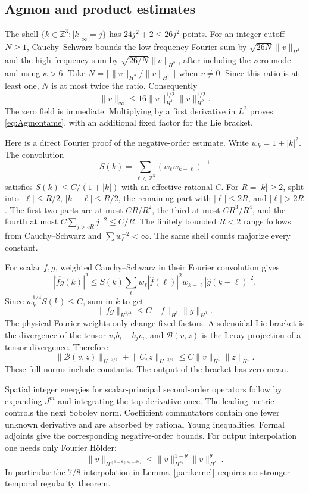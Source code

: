 \documentclass[11pt,a4paper]{amsart}
\theoremstyle{definition}
\theoremstyle{remark}
\numberwithin{equation}{section}
\newcommand{\Z}{\mathbb Z}
\newcommand{\Bcal}{\mathcal B}
\newcommand{\norm}[1]{\lVert #1\rVert}
\begin{document}
\subsection{Agmon and product estimates}
The shell $\{k\in\Z^3:|k|_\infty=j\}$ has $24j^2+2\le26j^2$ points. For an integer cutoff $N\ge1$, Cauchy--Schwarz bounds the low-frequency Fourier sum by $\sqrt{26N}\|v\|_{H^1}$ and the high-frequency sum by $\sqrt{26/N}\|v\|_{H^2}$, after including the zero mode and using $\kappa>6$. Take $N=\lceil\|v\|_{H^2}/\|v\|_{H^1}\rceil$ when $v\ne0$. Since this ratio is at least one, $N$ is at most twice the ratio. Consequently
\begin{equation}\label{eq:appagmon}
 \norm v_\infty\le16\norm v_{H^1}^{1/2}\norm v_{H^2}^{1/2}.
\end{equation}
The zero field is immediate. Multiplying by a first derivative in $L^2$ proves \eqref{eq:Agmontame}, with an additional fixed factor for the Lie bracket.

Here is a direct Fourier proof of the negative-order estimate. Write $w_k=1+|k|^2$. The convolution
\[
 S(k)=\sum_{\ell\in\Z^3}(w_\ell w_{k-\ell})^{-1}
\]
satisfies $S(k)\le C/(1+|k|)$ with an effective rational $C$. For $R=|k|\ge2$, split into $|\ell|\le R/2$, $|k-\ell|\le R/2$, the remaining part with $|\ell|\le2R$, and $|\ell|>2R$. The first two parts are at most $CR/R^2$, the third at most $CR^3/R^4$, and the fourth at most $C\sum_{j>cR}j^{-2}\le C/R$. The finitely bounded $R<2$ range follows from Cauchy--Schwarz and $\sum w_\ell^{-2}<\infty$. The same shell counts majorize every constant.

For scalar $f,g$, weighted Cauchy--Schwarz in their Fourier convolution gives
\[
 |\widehat{fg}(k)|^2\le S(k)
   \sum_\ell w_\ell|\widehat f(\ell)|^2
                   w_{k-\ell}|\widehat g(k-\ell)|^2.
\]
Since $w_k^{1/4}S(k)\le C$, sum in $k$ to get
\[
 \norm{fg}_{H^{1/4}}\le C\norm f_{H^1}\norm g_{H^1}.
\]
The physical Fourier weights only change fixed factors. A solenoidal Lie bracket is the divergence of the tensor $v_jb_i-b_jv_i$, and $\Bcal(v,z)$ is the Leray projection of a tensor divergence. Therefore
\begin{equation}\label{eq:appnegative}
 \norm{\Bcal(v,z)}_{H^{-3/4}}+\norm{C_vz}_{H^{-3/4}}
 \le C\norm v_{H^1}\norm z_{H^1}.
\end{equation}
These full norms include constants. The output of the bracket has zero mean.

Spatial integer energies for scalar-principal second-order operators follow by expanding $J^m$ and integrating the top derivative once. The leading metric controls the next Sobolev norm. Coefficient commutators contain one fewer unknown derivative and are absorbed by rational Young inequalities. Formal adjoints give the corresponding negative-order bounds. For output interpolation one needs only Fourier H\"older:
\[
 \norm v_{H^{(1-\theta)s_0+\theta s_1}}
 \le\norm v_{H^{s_0}}^{1-\theta}\norm v_{H^{s_1}}^\theta.
\]
In particular the $7/8$ interpolation in Lemma~\ref{par:kernel} requires no stronger temporal regularity theorem.
\end{document}
